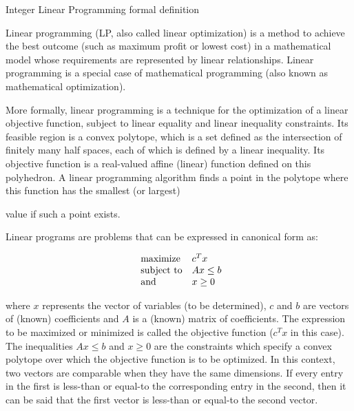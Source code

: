 \documentclass[9pt]{extarticle}
\begin{document}
    \begin{section}{Integer Linear Programming formal definition}

        Linear programming (LP, also called linear optimization) is a method to achieve the best outcome (such as maximum 
        profit or lowest cost) in a mathematical model whose requirements are represented by linear relationships. 
        Linear programming is a special case of mathematical programming (also known as mathematical optimization).
        \cite{wiki:lp}

        More formally, linear programming is a technique for the optimization of a linear objective function, subject to 
        linear equality and linear inequality constraints. 
        Its feasible region is a convex polytope, which is a set defined as the intersection of finitely many half spaces, 
        each of which is defined by a linear inequality. 
        Its objective function is a real-valued affine (linear) function defined on this polyhedron. 
        A linear programming algorithm finds a point in the polytope where this function has the smallest (or largest) 

        value if such a point exists. \cite{wiki:lp}
        \newpage

        Linear programs are problems that can be expressed in canonical form as:
        
        \begin{equation*}
            \begin{array}{ll@{}ll}
                \text{maximize}  & c^{T}x \\
                \text{subject to} & Ax \leq b \\
                \text{and} & x \ge 0
            \end{array}
        \end{equation*}

        where $x$ represents the vector of variables (to be determined), $c$ and $b$ are vectors of (known) coefficients and 
        $A$ is a (known) matrix of coefficients.
        The expression to be maximized or minimized is called the objective function ($c^{T}x$ in this case). 
        The inequalities $Ax \leq b$ and $x \ge 0$ are the constraints which specify a convex polytope over which the objective 
        function is to be optimized. 
        In this context, two vectors are comparable when they have the same dimensions. 
        If every entry in the first is less-than or equal-to the corresponding entry in the second, then it can be said 
        that the first vector is less-than or equal-to the second vector.
        \cite{wiki:lp}


\end{section}
\end{document}
